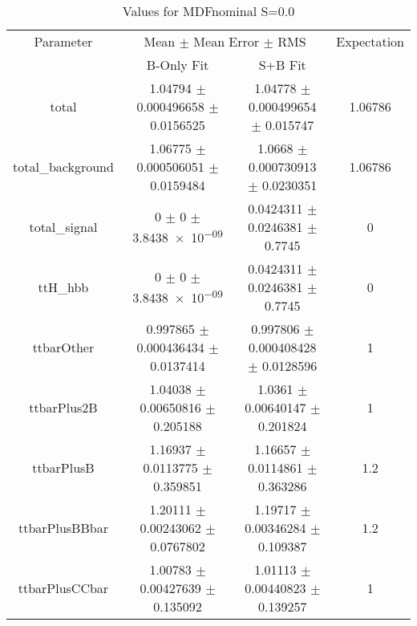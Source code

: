 \begin{table}
\centering
\caption{Values for MDFnominal S=0.0}
\begin{tabular}{cccc}
\toprule
Parameter & \multicolumn{2}{c}{Mean $\pm$ Mean Error $\pm$ RMS} & Expectation\\
 & B-Only Fit & S+B Fit & \\
\midrule
total & \num{1.04794} $\pm$ \num{0.000496658} $\pm$ \num{0.0156525} & \num{1.04778} $\pm$ \num{0.000499654} $\pm$ \num{0.015747} & \num{1.06786}\\
total\_background & \num{1.06775} $\pm$ \num{0.000506051} $\pm$ \num{0.0159484} & \num{1.0668} $\pm$ \num{0.000730913} $\pm$ \num{0.0230351} & \num{1.06786}\\
total\_signal & \num{0} $\pm$ \num{0} $\pm$ \num{3.8438e-09} & \num{0.0424311} $\pm$ \num{0.0246381} $\pm$ \num{0.7745} & \num{0}\\
ttH\_hbb & \num{0} $\pm$ \num{0} $\pm$ \num{3.8438e-09} & \num{0.0424311} $\pm$ \num{0.0246381} $\pm$ \num{0.7745} & \num{0}\\
ttbarOther & \num{0.997865} $\pm$ \num{0.000436434} $\pm$ \num{0.0137414} & \num{0.997806} $\pm$ \num{0.000408428} $\pm$ \num{0.0128596} & \num{1}\\
ttbarPlus2B & \num{1.04038} $\pm$ \num{0.00650816} $\pm$ \num{0.205188} & \num{1.0361} $\pm$ \num{0.00640147} $\pm$ \num{0.201824} & \num{1}\\
ttbarPlusB & \num{1.16937} $\pm$ \num{0.0113775} $\pm$ \num{0.359851} & \num{1.16657} $\pm$ \num{0.0114861} $\pm$ \num{0.363286} & \num{1.2}\\
ttbarPlusBBbar & \num{1.20111} $\pm$ \num{0.00243062} $\pm$ \num{0.0767802} & \num{1.19717} $\pm$ \num{0.00346284} $\pm$ \num{0.109387} & \num{1.2}\\
ttbarPlusCCbar & \num{1.00783} $\pm$ \num{0.00427639} $\pm$ \num{0.135092} & \num{1.01113} $\pm$ \num{0.00440823} $\pm$ \num{0.139257} & \num{1}\\
\bottomrule
\end{tabular}
\end{table}
